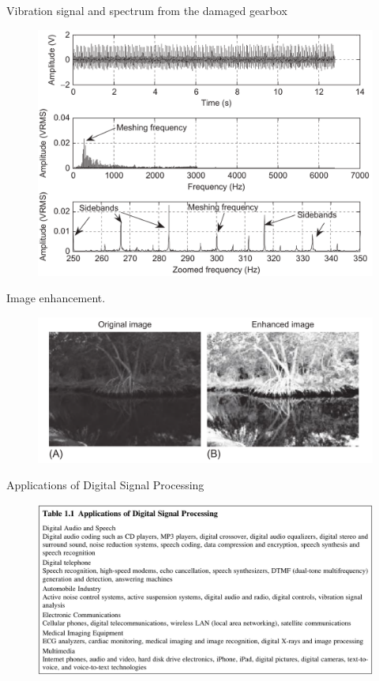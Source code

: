 \documentclass[pdflatex,compress,mathserif]{beamer}
\begin{document}
\begin{frame}{Vibration signal and spectrum from the damaged gearbox}
	\begin{figure}
		\includegraphics[width=0.8\linewidth]{img/img13}
	\end{figure}
\end{frame}

\begin{frame}{Image enhancement.}
	\begin{figure}
		\includegraphics[width=\linewidth]{img/img14}
	\end{figure}
\end{frame}

\begin{frame}{Applications of Digital Signal Processing}
	\begin{figure}
		\includegraphics[width=\linewidth]{img/img15}
	\end{figure}
\end{frame}
\end{document}
